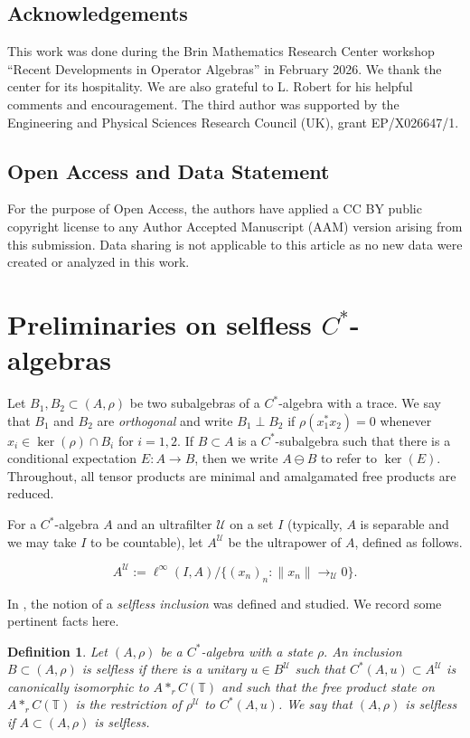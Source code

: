 \documentclass{amsart}
\newtheorem{definition}[theorem]{Definition}
\theoremstyle{definition}
\newcommand{\T}{\mathbb{T}}
\newcommand{\cU}{\mathcal{U}}
\begin{document}
\subsection*{Acknowledgements}
This work was done during the Brin Mathematics Research Center workshop ``Recent Developments in Operator Algebras'' in February 2026. We thank the center for its hospitality. We are also grateful to L. Robert for his helpful comments and encouragement.  The third author was supported by the Engineering and Physical Sciences Research Council (UK), grant EP/X026647/1. 

\subsection{Open Access and Data Statement}

For the purpose of Open Access, the authors have applied a CC BY public copyright license to any Author Accepted Manuscript (AAM) version arising from this submission. Data sharing is not applicable to this article as no new data were created or analyzed in this work.


\section{Preliminaries on selfless $C^*$-algebras}

Let $B_1,B_2 \subset (A,\rho)$ be two subalgebras of a $C^*$-algebra with a trace. We say that $B_1$ and $B_2$ are \emph{orthogonal} and write $B_1\perp B_2$ if $\rho(x_1^*x_2) = 0$ whenever $x_i \in \ker(\rho)\cap B_i$ for $i=1,2.$ If $B\subset A$ is a $C^*$-subalgebra such that there is a conditional expectation $E:A\to B$, then we write $A\ominus B$ to refer to $\ker(E)$. Throughout, all tensor products are minimal and amalgamated free products are reduced.

For a $C^*$-algebra $A$ and an ultrafilter $\cU$ on a set $I$ (typically, $A$ is separable and we may take $I$ to be countable), let $A^\cU$ be the ultrapower of $A$, defined as follows.

$$A^\cU := \ell^\infty(I,A)/\{(x_n)_n : \|x_n\|\to_\cU 0\}.$$

In \cite{hayes2025selfless}, the notion of a \emph{selfless inclusion} was defined and studied. We record some pertinent facts here.

\begin{definition}
    Let $(A,\rho)$ be a $C^*$-algebra with a state $\rho.$ An inclusion $B\subset (A,\rho)$ is \emph{selfless} if there is a unitary $u\in B^\cU$ such that $C^*(A,u) \subset A^\cU$ is canonically isomorphic to $A*_r C(\T)$ and such that the free product state on $A*_r C(\T)$ is the restriction of $\rho^\cU$ to $C^*(A,u)$. We say that $(A,\rho)$ is \emph{selfless} if $A\subset (A,\rho)$ is selfless.
\end{definition}
\end{document}
